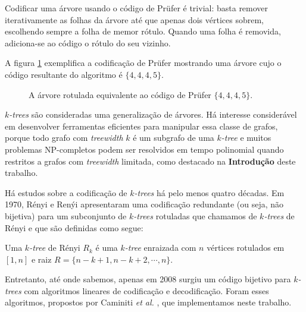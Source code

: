 Codificar uma árvore usando o código de Prüfer é trivial: basta remover iterativamente as folhas da árvore até que apenas dois vértices sobrem, escolhendo sempre a folha de memor rótulo. Quando uma folha é removida, adiciona-se ao código o rótulo do seu vizinho.

A figura \ref{fig:prufer} exemplifica a codificação de Prüfer mostrando uma árvore cujo o código resultante do algoritmo é $\{4, 4, 4, 5\}$.

\begin{figure}
  \centering

  \caption{A árvore rotulada equivalente ao código de Prüfer $\{4, 4, 4, 5\}$.}
  \label{fig:prufer}
\end{figure}

\vspace{2em}

\emph{$k$-trees} \cite{harary} são consideradas uma generalização de árvores. Há interesse considerável em desenvolver ferramentas eficientes para manipular essa classe de grafos, porque todo grafo com \emph{treewidth} $k$ é um subgrafo de uma \emph{$k$-tree} e muitos problemas NP-completos podem ser resolvidos em tempo polinomial quando restritos a grafos com \emph{treewidth} limitada, como destacado na \textbf{Introdução} deste trabalho.

Há estudos sobre a codificação de \emph{$k$-trees} há pelo menos quatro décadas. Em 1970, Rényi e Renýi apresentaram uma codificação redundante (ou seja, não bijetiva) para um subconjunto de \emph{$k$-trees} rotuladas que chamamos de \emph{$k$-trees} de Rényi e que são definidas como segue:

\begin{definition}
  \cite{renyi} Uma \emph{$k$-tree} de Rényi $R_k$ é uma \emph{$k$-tree} enraizada com $n$ vértices rotulados em $[1, n]$ e raiz $R = \{n-k+1, n-k+2, \cdots, n\}$.
\end{definition}

Entretanto, até onde sabemos, apenas em 2008 surgiu um código bijetivo para \emph{$k$-trees} com algoritmos lineares de codificação e decodificação. Foram esses algoritmos, propostos por Caminiti \emph{et al.} \cite{caminiti}, que implementamos neste trabalho.

